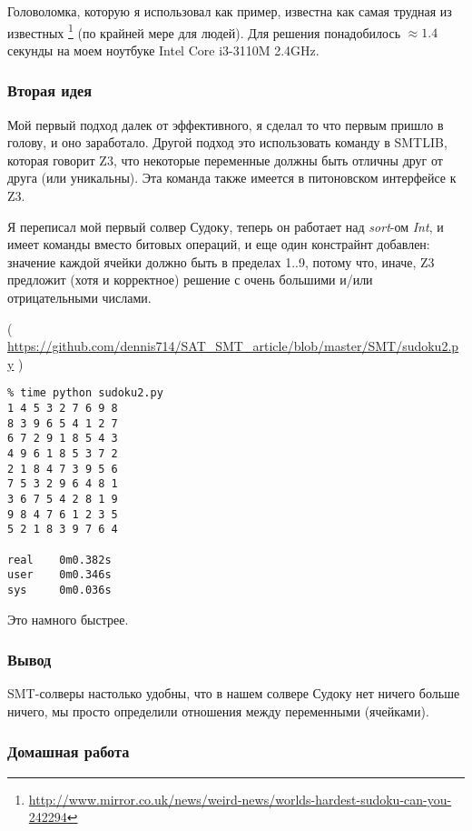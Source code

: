 Головоломка, которую я использовал как пример, известна как самая трудная из известных
\footnote{\url{http://www.mirror.co.uk/news/weird-news/worlds-hardest-sudoku-can-you-242294}} (по крайней мере для людей).
Для решения понадобилось $\approx 1.4$ секунды на моем ноутбуке Intel Core i3-3110M 2.4GHz.

\subsubsection{Вторая идея}

Мой первый подход далек от эффективного, я сделал то что первым пришло в голову, и оно заработало.
Другой подход это использовать команду  в SMTLIB, которая говорит Z3, что некоторые переменные
должны быть отличны друг от друга (или уникальны).
Эта команда также имеется в питоновском интерфейсе к Z3.

Я переписал мой первый солвер Судоку, теперь он работает над \textit{sort}-ом 
\textit{Int}, и имеет команды  вместо битовых операций,
и еще один констрайнт добавлен: значение каждой ячейки должно быть в пределах 1..9, потому что, иначе, Z3 предложит
(хотя и корректное) решение с очень большими и/или отрицательными числами.


( \url{https://github.com/dennis714/SAT_SMT_article/blob/master/SMT/sudoku2.py} )

\begin{lstlisting}
% time python sudoku2.py
1 4 5 3 2 7 6 9 8
8 3 9 6 5 4 1 2 7
6 7 2 9 1 8 5 4 3
4 9 6 1 8 5 3 7 2
2 1 8 4 7 3 9 5 6
7 5 3 2 9 6 4 8 1
3 6 7 5 4 2 8 1 9
9 8 4 7 6 1 2 3 5
5 2 1 8 3 9 7 6 4

real    0m0.382s
user    0m0.346s
sys     0m0.036s
\end{lstlisting}

Это намного быстрее.

\subsubsection{Вывод}

\ac{SMT}-солверы настолько удобны, что в нашем солвере Судоку нет ничего больше ничего, мы просто определили
отношения между переменными (ячейками).

\subsubsection{Домашная работа}

